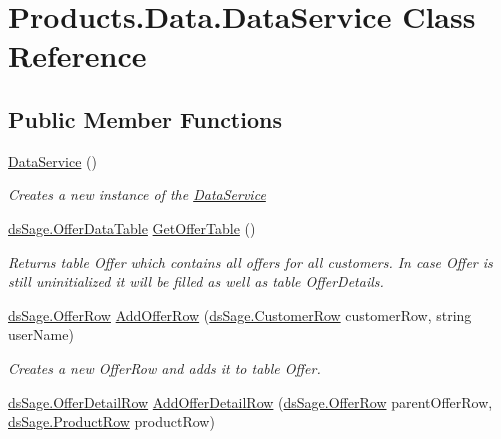 \hypertarget{class_products_1_1_data_1_1_data_service}{}\section{Products.\+Data.\+Data\+Service Class Reference}
\label{class_products_1_1_data_1_1_data_service}
\subsection*{Public Member Functions}
\begin{DoxyCompactItemize}
\item 
\hyperlink{class_products_1_1_data_1_1_data_service_a2e21c394ad57be7c1eb80d29f04276ce}{Data\+Service} ()
\begin{DoxyCompactList}\small\item\em Creates a new instance of the \hyperlink{class_products_1_1_data_1_1_data_service}{Data\+Service} \end{DoxyCompactList}\item 
\hyperlink{class_products_1_1_data_1_1ds_sage_1_1_offer_data_table}{ds\+Sage.\+Offer\+Data\+Table} \hyperlink{class_products_1_1_data_1_1_data_service_a3cdf063c0ceeb9b7f3e38fc30229b797}{Get\+Offer\+Table} ()
\begin{DoxyCompactList}\small\item\em Returns table Offer which contains all offers for all customers. In case Offer is still uninitialized it will be filled as well as table Offer\+Details. \end{DoxyCompactList}\item 
\hyperlink{class_products_1_1_data_1_1ds_sage_1_1_offer_row}{ds\+Sage.\+Offer\+Row} \hyperlink{class_products_1_1_data_1_1_data_service_a9681848a4f23814dae838a6c11b5325a}{Add\+Offer\+Row} (\hyperlink{class_products_1_1_data_1_1ds_sage_1_1_customer_row}{ds\+Sage.\+Customer\+Row} customer\+Row, string user\+Name)
\begin{DoxyCompactList}\small\item\em Creates a new Offer\+Row and adds it to table Offer. \end{DoxyCompactList}\item 
\hyperlink{class_products_1_1_data_1_1ds_sage_1_1_offer_detail_row}{ds\+Sage.\+Offer\+Detail\+Row} \hyperlink{class_products_1_1_data_1_1_data_service_a527c093923535bcf1ef5384f7f4dbdbf}{Add\+Offer\+Detail\+Row} (\hyperlink{class_products_1_1_data_1_1ds_sage_1_1_offer_row}{ds\+Sage.\+Offer\+Row} parent\+Offer\+Row, \hyperlink{class_products_1_1_data_1_1ds_sage_1_1_product_row}{ds\+Sage.\+Product\+Row} product\+Row)

\end{DoxyCompactItemize}
